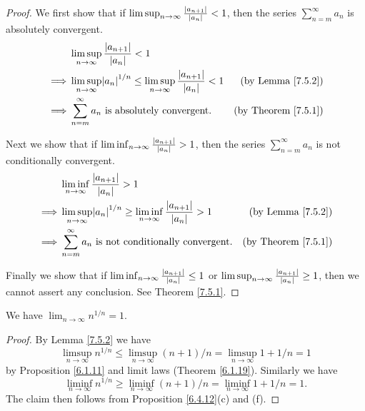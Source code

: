 \begin{proof}
    We first show that if \(\limsup_{n \to \infty} \frac{\left\lvert a_{n + 1}\right\rvert}{\left\lvert a_n\right\rvert} < 1\), then the series \(\sum_{n = m}^\infty a_n\) is absolutely convergent.
    \begin{align*}
                 & \limsup_{n \to \infty} \frac{\abs{a_{n + 1}}}{\abs{a_n}} < 1                                                                                 \\
        \implies & \limsup_{n \to \infty} \abs{a_n}^{1 / n} \leq \limsup_{n \to \infty} \frac{\abs{a_{n + 1}}}{\abs{a_n}} < 1 & \text{(by Lemma \ref{7.5.2})}   \\
        \implies & \sum_{n = m}^\infty a_n \text{ is absolutely convergent}.                                                  & \text{(by Theorem \ref{7.5.1})}
    \end{align*}

    Next we show that if \(\liminf_{n \to \infty} \frac{\left\lvert a_{n + 1}\right\rvert}{\left\lvert a_n\right\rvert} > 1\), then the series \(\sum_{n = m}^\infty a_n\) is not conditionally convergent.
    \begin{align*}
                 & \liminf_{n \to \infty} \frac{\abs{a_{n + 1}}}{\abs{a_n}} > 1                                                                                 \\
        \implies & \limsup_{n \to \infty} \abs{a_n}^{1 / n} \geq \liminf_{n \to \infty} \frac{\abs{a_{n + 1}}}{\abs{a_n}} > 1 & \text{(by Lemma \ref{7.5.2})}   \\
        \implies & \sum_{n = m}^\infty a_n \text{ is not conditionally convergent}.                                           & \text{(by Theorem \ref{7.5.1})}
    \end{align*}

    Finally we show that if \(\liminf_{n \to \infty} \frac{\left\lvert a_{n + 1}\right\rvert}{\left\lvert a_n\right\rvert} \leq 1\) or \(\limsup_{n \to \infty} \frac{\left\lvert a_{n + 1}\right\rvert}{\left\lvert a_n\right\rvert} \geq 1\), then we cannot assert any conclusion.
    See Theorem \ref{7.5.1}.
\end{proof}

\begin{proposition}\label{7.5.4}
    We have \(\lim_{n \to \infty} n^{1 / n} = 1\).
\end{proposition}

\begin{proof}
    By Lemma \ref{7.5.2} we have
    \[
        \limsup_{n \to \infty} n^{1 / n} \leq \limsup_{n \to \infty} (n + 1) / n = \limsup_{n \to \infty} 1 + 1 / n = 1
    \]
    by Proposition \ref{6.1.11} and limit laws (Theorem \ref{6.1.19}).
    Similarly we have
    \[
        \liminf_{n \to \infty} n^{1 / n} \geq \liminf_{n \to \infty} (n + 1) / n = \liminf_{n \to \infty} 1 + 1 / n = 1.
    \]
    The claim then follows from Proposition \ref{6.4.12}(c) and (f).
\end{proof}

